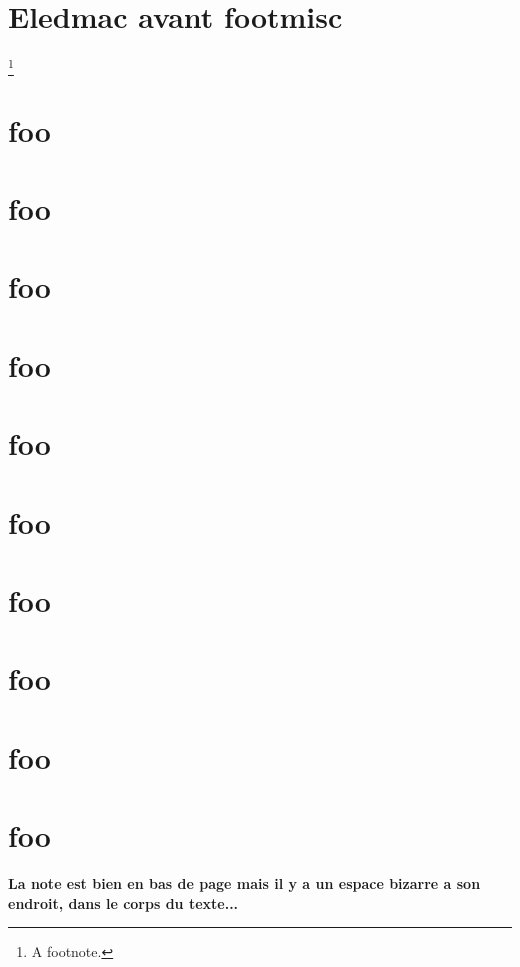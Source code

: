 \documentclass{book}
\begin{document}
 
\section{Eledmac avant footmisc}
 
\kant[7-8]
 
\begin{pairs}
\begin{Leftside}
 \beginnumbering
 \pstart\kant[2]\footnote{A footnote.}\kant[3]\pend
 \endnumbering
\end{Leftside}
\begin{Rightside}
 \beginnumbering
 \pstart\kant[4]\pend
 \endnumbering
\end{Rightside}
\Columns
\end{pairs}
 
\section{foo}
\section{foo}
\section{foo}
\section{foo}
\section{foo}
\section{foo}
\section{foo}
\section{foo}
\section{foo}
\section{foo}
 
\Large\bf La note est bien en bas de page mais il y a  un espace bizarre a
son endroit, dans le corps du texte...
 
 
\end{document}
